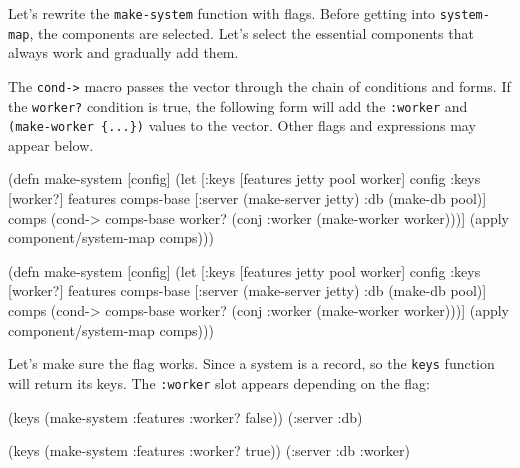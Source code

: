 Let's rewrite the \verb|make-system| function with flags. Before getting into \verb|system-map|, the components are selected. Let's select the essential components that always work and gradually add them.

The \verb|cond->| macro passes the vector through the chain of conditions and forms. If the \verb|worker?| condition is true, the following form will add the \verb|:worker| and \verb| (make-worker {...})| values to the vector. Other flags and expressions may appear below.

\ifnarrow

\begin{english}
  \begin{clojure}
(defn make-system [config]
  (let [{:keys [features jetty
                pool worker]} config
        {:keys [worker?]} features
        comps-base [:server
                    (make-server jetty)
                    :db (make-db pool)]
        comps (cond-> comps-base
                worker?
                (conj :worker
                  (make-worker worker)))]
    (apply component/system-map comps)))
  \end{clojure}
\end{english}

\else

\begin{english}
  \begin{clojure}
(defn make-system [config]
  (let [{:keys [features jetty pool worker]} config
        {:keys [worker?]} features
        comps-base [:server (make-server jetty)
                    :db (make-db pool)]
        comps (cond-> comps-base
                worker?
                (conj :worker (make-worker worker)))]
    (apply component/system-map comps)))
  \end{clojure}
\end{english}

\fi

Let's make sure the flag works. Since a system is a record, so the \verb|keys| function will return its keys. The \verb|:worker| slot appears depending on the flag:

\ifnarrow

\begin{english}
  \begin{clojure}
(keys (make-system
        {:features {:worker? false}}))
(:server :db)

(keys (make-system
        {:features {:worker? true}}))
(:server :db :worker)
  \end{clojure}
\end{english}

